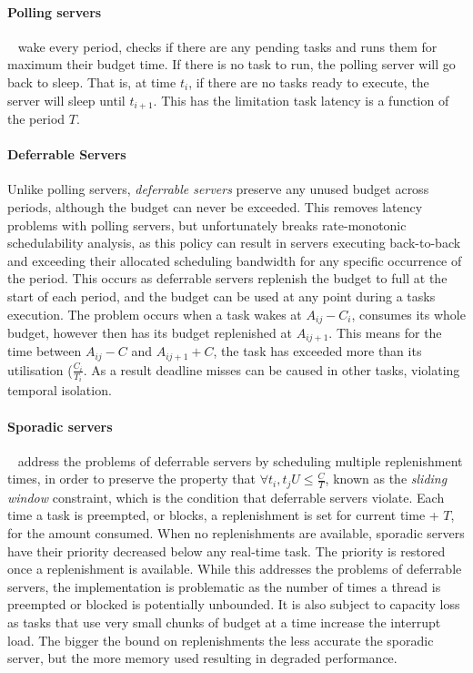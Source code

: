 \paragraph{Polling servers}\label{p:polling-servers}~\citep{Lehoczky_LS_87} wake every period,
checks if there are any pending tasks and runs them for maximum their budget time. If there is no
task to run, the polling server will go back to sleep. That is, at time $t_{i}$, if there are no
tasks ready to execute, the server will sleep until $t_{i+1}$. This has the limitation task latency
is a function of the period $T$.

\paragraph{Deferrable Servers} Unlike polling servers, \emph{deferrable
servers}\citep{Lehoczky_LS_87, Strosnider_LS_95} preserve any unused budget across periods, although
the budget can never be exceeded.  This removes latency problems with polling servers, but
unfortunately breaks rate-monotonic schedulability analysis, as this policy can result in servers
executing back-to-back and exceeding their allocated scheduling bandwidth for any specific occurrence of
the period.  This occurs as deferrable servers replenish the budget to full at the start of each
period, and the budget can be used at any point during a tasks execution.  The problem occurs when a
task wakes at $A_{ij} - C_{i}$, consumes its whole budget, however then has its budget replenished at
$A_{ij+1}$.  This means for the time between $A_{ij} - C$ and $A_{ij+1} + C$, the task has exceeded
more than its utilisation ($\frac{C_{i}}{T_{i}}.$ As a result deadline misses can be caused in other
tasks, violating temporal isolation.

\paragraph{Sporadic servers}~\citep{Sprunt_SL_89a}\label{p:sporadic} address the problems of
deferrable servers by scheduling multiple replenishment times, in order to preserve the property
that $\forall t_{i}, t_{j} U \leq \frac{C}{T}$, known as the \emph{sliding window} constraint, which
is the condition that deferrable servers violate.  Each time a task is preempted, or blocks, a
replenishment is set for current time + $T$, for the amount consumed.  When no replenishments are
available, sporadic servers have their priority decreased below any real-time task.  The priority is
restored once a replenishment is available.  While this addresses the problems of deferrable
servers, the implementation is problematic as the number of times a thread is preempted or blocked
is potentially unbounded.  It is also subject to capacity loss as tasks that use very small chunks
of budget at a time increase the interrupt load.  The bigger the bound on replenishments the less
accurate the sporadic server, but the more memory used resulting in degraded performance.

